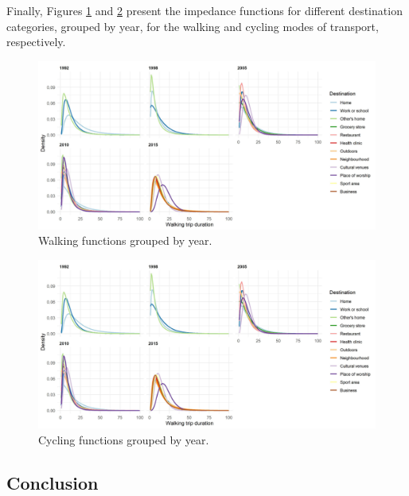 \documentclass[preprint, 3p,
authoryear]{elsarticle} %
\begin{document}
Finally, Figures \ref{fig:walking-function-by-year-fig} and
\ref{fig:cycling-function-by-year-fig} present the impedance functions
for different destination categories, grouped by year, for the walking
and cycling modes of transport, respectively.

\begin{figure}

{\centering \includegraphics[width=1\linewidth]{figures/walking_functions_by_year} 

}

\caption{Walking functions grouped by year.}\label{fig:walking-function-by-year-fig}
\end{figure}

\begin{figure}

{\centering \includegraphics[width=1\linewidth]{figures/cycling_functions_by_year} 

}

\caption{Cycling functions grouped by year.}\label{fig:cycling-function-by-year-fig}
\end{figure}

\hypertarget{conclusion}{%
\subsection{Conclusion}\label{conclusion}}
\end{document}
